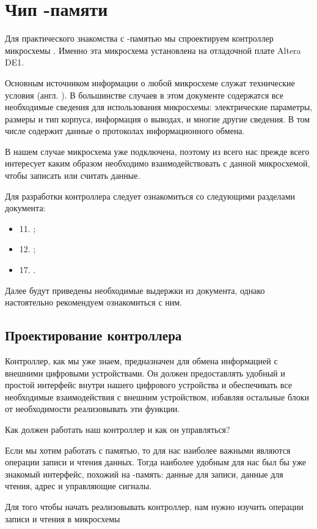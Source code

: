 % 

\section{Чип -памяти }

\par{Для практического знакомства с -памятью мы спроектируем контроллер микросхемы . Именно эта микросхема установлена на отладочной плате Altera DE1.}
\par{Основным источником информации о любой микросхеме служат технические условия (англ. ). В большинстве случаев в этом документе содержатся все необходимые сведения для использования микросхемы: электрические параметры, размеры и тип корпуса, информация о выводах, и многие другие сведения. В том числе  содержит данные о протоколах информационного обмена.}
\par{В нашем случае микросхема уже подключена, поэтому из всего  нас прежде всего интересует каким образом необходимо взаимодействовать с данной микросхемой, чтобы записать или считать данные.}
\par{Для разработки контроллера следует ознакомиться со следующими разделами документа:
\begin{itemize}[noitemsep,label={}]
  \item 11. ;
  \item 12. ;
  \item 17. .
\end{itemize}}
\par{Далее будут приведены необходимые выдержки из документа, однако настоятельно рекомендуем ознакомиться с ним.}

\subsection{Проектирование контроллера }
\par{Контроллер, как мы уже знаем, предназначен для обмена информацией с внешними цифровыми устройствами. Он должен предоставлять удобный и простой интерфейс внутри нашего цифрового устройства и обеспечивать все необходимые взаимодействия с внешним устройством, избавляя остальные блоки от необходимости реализовывать эти функции.}
\par{Как должен работать наш контроллер и как он управляться?}
\par{Если мы хотим работать с памятью, то для нас наиболее важными являются операции записи и чтения данных.  Тогда наиболее удобным для нас был бы уже знакомый интерфейс, похожий на -память: данные для записи, данные для чтения, адрес и управляющие сигналы.}
\par{Для того чтобы начать реализовывать контроллер, нам нужно изучить операции записи и чтения в микросхемы }

